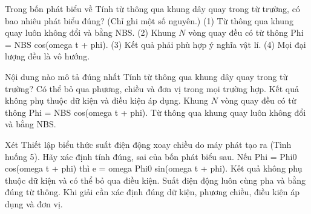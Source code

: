 \begin{ex}
Trong bốn phát biểu về Tính từ thông qua khung dây quay trong từ trường, có bao nhiêu phát biểu đúng? (Chỉ ghi một số nguyên.) (1) Từ thông qua khung quay luôn không đổi và bằng NBS. (2) Khung $N$ vòng quay đều có từ thông Phi = NBS cos(omega t + phi). (3) Kết quả phải phù hợp ý nghĩa vật lí. (4) Mọi đại lượng đều là vô hướng.
\end{ex}

\begin{ex}
Nội dung nào mô tả đúng nhất Tính từ thông qua khung dây quay trong từ trường?
\choice
{Có thể bỏ qua phương, chiều và đơn vị trong mọi trường hợp.}
{Kết quả không phụ thuộc dữ kiện và điều kiện áp dụng.}
{\True Khung $N$ vòng quay đều có từ thông Phi = NBS cos(omega t + phi).}
{Từ thông qua khung quay luôn không đổi và bằng NBS.}
\end{ex}

\begin{ex}
Xét Thiết lập biểu thức suất điện động xoay chiều do máy phát tạo ra (Tình huống 5). Hãy xác định tính đúng, sai của bốn phát biểu sau.
\choiceTF
{\True Nếu Phi = Phi0 cos(omega t + phi) thì e = omega Phi0 sin(omega t + phi).}
{Kết quả không phụ thuộc dữ kiện và có thể bỏ qua điều kiện.}
{Suất điện động luôn cùng pha và bằng đúng từ thông.}
{\True Khi giải cần xác định đúng dữ kiện, phương chiều, điều kiện áp dụng và đơn vị.}
\end{ex}

